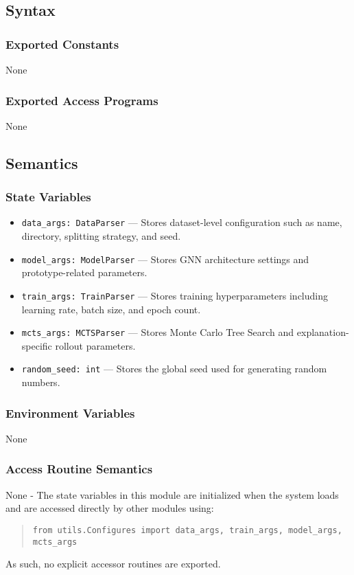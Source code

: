 \documentclass[12pt, titlepage]{article}
\begin{document}
\subsection{Syntax}

\subsubsection{Exported Constants}
None

\subsubsection{Exported Access Programs}
None

\subsection{Semantics}

\subsubsection{State Variables}
\begin{itemize}
  \item \texttt{data\_args: DataParser} — Stores dataset-level configuration such as name, directory, splitting strategy, and seed.
  \item \texttt{model\_args: ModelParser} — Stores GNN architecture settings and prototype-related parameters.
  \item \texttt{train\_args: TrainParser} — Stores training hyperparameters including learning rate, batch size, and epoch count.
  \item \texttt{mcts\_args: MCTSParser} — Stores Monte Carlo Tree Search and explanation-specific rollout parameters.
  \item \texttt{random\_seed: int} — Stores the global seed used for generating random numbers.
\end{itemize}

\subsubsection{Environment Variables}
None

\subsubsection{Access Routine Semantics}
None - The state variables in this module are initialized when the system loads and are accessed directly by other modules using:
\begin{quote}
\texttt{from utils.Configures import data\_args, train\_args, model\_args, mcts\_args}
\end{quote}
As such, no explicit accessor routines are exported.
\end{document}
